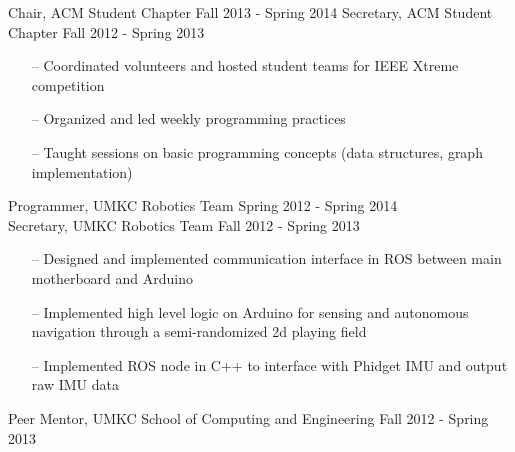 \documentclass[line,margin]{res}
\begin{document}
\begin{resume}
		
		
		Chair, ACM Student Chapter \hfill Fall 2013 - Spring 2014
		Secretary, ACM Student Chapter \hfill Fall 2012 - Spring 2013 
		         \begin{itemize} [leftmargin=5mm]  \itemsep -2pt %
                 \item[--] Coordinated volunteers and hosted student teams for IEEE Xtreme competition 
                 \item[--] Organized and led weekly programming practices
                 \item[--] Taught sessions on basic programming concepts (data structures, graph implementation)
                 \end{itemize} 

		
		Programmer, UMKC Robotics Team \hfill Spring 2012 - Spring 2014 \\
		Secretary, UMKC Robotics Team \hfill  Fall 2012 - Spring 2013 	
		\begin{itemize} [leftmargin=5mm]  \itemsep -2pt %
                 \item[--] Designed and implemented communication interface in ROS between main motherboard and Arduino 
		\item[--] Implemented high level logic on Arduino for sensing and autonomous navigation through a semi-randomized 2d playing field
                 \item[--] Implemented ROS node in C++ to interface with Phidget IMU and output raw IMU data

                 \end{itemize} 
		
		


		Peer Mentor, UMKC School of Computing and Engineering \hfill Fall 2012 - Spring 2013 

		


\end{resume}
\end{document}
